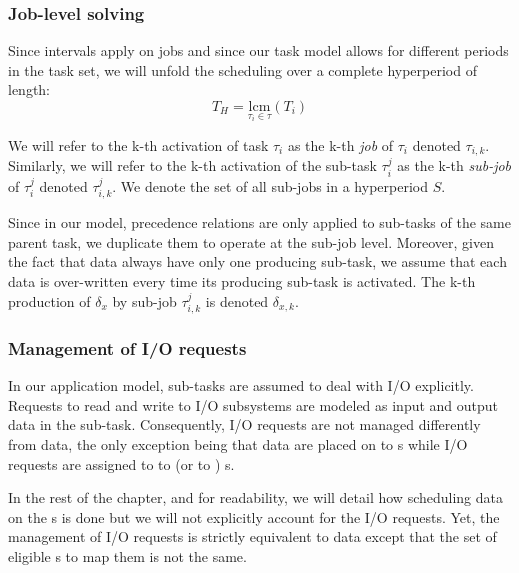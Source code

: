 \documentclass[main.tex]{subfiles}
\begin{document}
\subsubsection{Job-level solving}
Since intervals apply on jobs and since our task model allows for different
periods in the task set, we will unfold the scheduling over a complete
hyperperiod of length:
\begin{displaymath}
    T_H = \underset{\tau_i \in \tau}{\text{lcm}} (T_i)
\end{displaymath}

We will refer to the k-th activation of task $\tau_i$ as the k-th \emph{job} of
$\tau_i$ denoted $\tau_{i,k}$. Similarly, we will refer to the k-th activation
of the sub-task $\tau_i^j$ as the k-th \emph{sub-job} of $\tau_i^j$ denoted
$\tau_{i,k}^j$. We denote the set of all sub-jobs in a hyperperiod $S$.

Since in our model, precedence relations are only applied to sub-tasks of the
same parent task, we duplicate them to operate at the sub-job level. Moreover,
given the fact that data always have only one producing sub-task, we assume
that each data is over-written every time its producing sub-task is activated.
The k-th production of $\delta_x$ by sub-job $\tau_{i,k}^j$ is denoted
$\delta_{x,k}$.

\subsubsection{Management of I/O requests}
In our application model, sub-tasks are assumed to deal with I/O explicitly.
Requests to read and write to I/O subsystems are modeled as input and output
data in the sub-task. Consequently, I/O requests are not managed differently
from data, the only exception being that data are placed on \PN{} to \PN{}
\PC{}s while I/O requests are assigned to \PN{} to \ION{} (or \ION{} to \PN{})
\PC{}s. 

In the rest of the chapter, and for readability, we will detail how scheduling
data on the \PC{}s is done but we will not explicitly account for the I/O
requests. Yet, the management of I/O requests is strictly equivalent to data
except that the set of eligible \PC{}s to map them is not the same.
\end{document}
